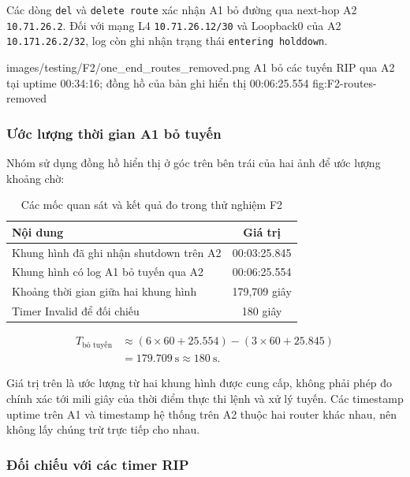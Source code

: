 Các dòng \texttt{del} và \texttt{delete route} xác nhận
A1 bỏ đường qua next-hop A2 \texttt{10.71.26.2}.
Đối với mạng L4 \texttt{10.71.26.12/30}
và Loopback0 của A2 \texttt{10.171.26.2/32},
log còn ghi nhận trạng thái \texttt{entering holddown}.


\partzeroimage
{images/testing/F2/one_end_routes_removed.png}
{A1 bỏ các tuyến RIP qua A2 tại uptime 00:34:16;
đồng hồ của bản ghi hiển thị 00:06:25.554}
{fig:F2-routes-removed}

\subsubsection{Ước lượng thời gian A1 bỏ tuyến}

Nhóm sử dụng đồng hồ hiển thị ở góc trên bên trái
của hai ảnh để ước lượng khoảng chờ:

\begin{table}[H]
\centering
\caption{Các mốc quan sát và kết quả đo trong thử nghiệm F2}
\label{tab:F2-results}
\small
\renewcommand{\arraystretch}{1.3}
\begin{tabularx}{\textwidth}{X c}
\toprule
\textbf{Nội dung} & \textbf{Giá trị} \\
\midrule
Khung hình đã ghi nhận shutdown trên A2 & 00:03:25.845 \\
Khung hình có log A1 bỏ tuyến qua A2 & 00:06:25.554 \\
Khoảng thời gian giữa hai khung hình & 179,709 giây \\
Timer Invalid để đối chiếu & 180 giây \\
\bottomrule
\end{tabularx}
\end{table}

\begin{equation}
\begin{aligned}
T_{\text{bỏ tuyến}}
&\approx (6 \times 60 + 25.554) - (3 \times 60 + 25.845)\\
&= \boxed{179.709\ \text{s}} \approx 180\ \text{s}.
\end{aligned}
\end{equation}

Giá trị trên là ước lượng từ hai khung hình được cung cấp,
không phải phép đo chính xác tới mili giây của thời điểm
thực thi lệnh và xử lý tuyến. Các timestamp uptime
trên A1 và timestamp hệ thống trên A2 thuộc hai router
khác nhau, nên không lấy chúng trừ trực tiếp cho nhau.

\subsubsection{Đối chiếu với các timer RIP}


